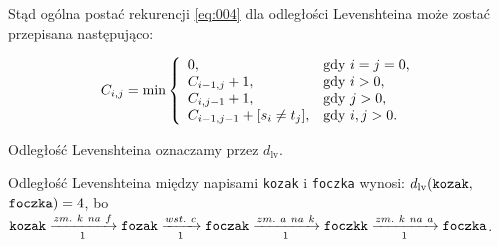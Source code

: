 \documentclass{praca1}
\begin{document}
\begin{definition}
Stąd ogólna postać rekurencji \eqref{eq:004} dla odległości Levenshteina może zostać przepisana następująco:

\begin{equation}
\label{eq:006}
C_{i,j} = \min\left\{
\begin{array}{l l}     
    0, & \text{gdy } i = j = 0,\\
    C_{i-1, j} + 1, & \text{gdy } i > 0, \\
    C_{i, j-1} + 1, & \text{gdy } j > 0, \\
    C_{i-1, j-1} + [s_{i}\neq t_{j}], & \text{gdy } i, j > 0.
\end{array}\right.
\end{equation}

Odległość Levenshteina oznaczamy przez $d_{\mathrm{lv}}$.
\end{definition}



\begin{example}
Odległość Levenshteina między napisami \verb|kozak| i \verb|foczka| wynosi: $d_{\mathrm{lv}}(\verb|kozak|,$ $\verb|foczka|) = 4$, bo $\verb|kozak| \xrightarrow[1]{zm.\ k\ na\ f} \verb|fozak|  \xrightarrow[1]{wst.\ c} \verb|foczak| \xrightarrow[1]{zm.\ a\ na\ k} \verb|foczkk| \xrightarrow[1]{zm.\ k\ na\ a} \verb|foczka|$.
\end{example}
\end{document}
